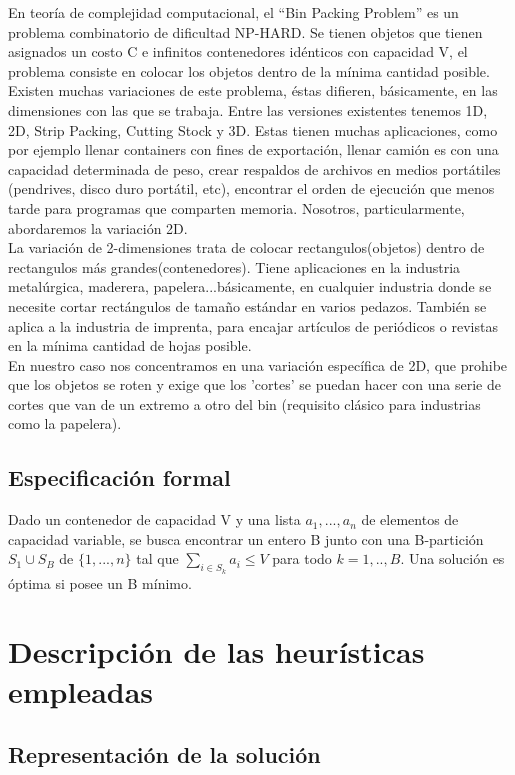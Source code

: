 \documentclass[a4paper,10pt]{article}
\begin{document}
En teoría de complejidad computacional, el ``Bin Packing Problem'' es un problema combinatorio de dificultad NP-HARD. Se tienen objetos que
tienen asignados un costo C e infinitos contenedores idénticos con capacidad V, el problema consiste en colocar los objetos dentro de la
mínima cantidad posible.\\
\indent Existen muchas variaciones de este problema, éstas difieren, básicamente, en las dimensiones con las que se trabaja.
Entre las versiones existentes tenemos 1D, 2D, Strip Packing, Cutting Stock y 3D. Estas tienen muchas aplicaciones, como por ejemplo llenar
containers con fines de exportación, llenar camión es con una capacidad determinada de peso, crear respaldos de archivos en medios portátiles
(pendrives, disco duro portátil, etc), encontrar el orden de ejecución que menos tarde para programas que comparten memoria. Nosotros,
particularmente, abordaremos la variación 2D.\\
\indent La variación de 2-dimensiones trata de colocar rectangulos(objetos) dentro de rectangulos más grandes(contenedores). Tiene aplicaciones en la
industria metalúrgica, maderera, papelera...básicamente, en cualquier industria donde se necesite cortar rectángulos de tamaño estándar en varios pedazos.
También se aplica a la industria de imprenta, para encajar artículos de periódicos o revistas en la mínima cantidad de hojas posible.\\
\indent En nuestro caso nos concentramos en una variación específica de 2D, que prohibe que los objetos se roten y exige que los 'cortes' se puedan
hacer con una serie de cortes que van de un extremo a otro del bin (requisito clásico para industrias como la papelera).

\subsection{Especificación formal}

Dado un contenedor de capacidad V y una lista $a_1, ..., a_n$ de elementos de capacidad variable, se busca encontrar un entero
B junto con una B-partición $S_1 \cup S_B$ de $\{1,...,n\}$ tal que $\sum_{i \in S_k}^{} {a_i \le V}$ para todo $k = 1,..,B$.
Una solución es óptima si posee un B mínimo.

\section{Descripción de las heurísticas empleadas}

\subsection{Representación de la solución}
\end{document}
